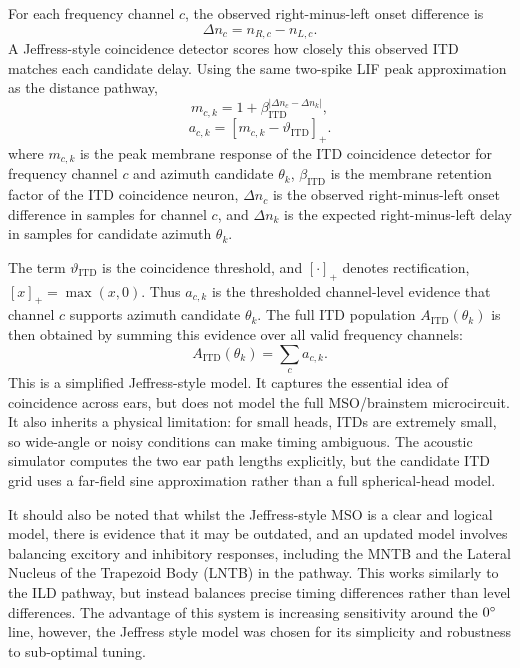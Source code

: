 For each frequency channel $c$, the observed right-minus-left onset difference is
\begin{equation}
    \Delta n_c = n_{R,c} - n_{L,c}.
\end{equation}
A Jeffress-style coincidence detector scores how closely this observed ITD matches each candidate delay. Using the same two-spike LIF peak approximation as the distance pathway,
\begin{equation}
    m_{c,k}
    =
    1 + \beta_{\mathrm{ITD}}^{|\Delta n_c-\Delta n_k|},
\end{equation}
\begin{equation}
    a_{c,k}
    =
    \left[
        m_{c,k}
        -
        \vartheta_{\mathrm{ITD}}
    \right]_+ .
\end{equation}
where $m_{c,k}$ is the peak membrane response of the ITD coincidence detector for frequency channel $c$ and azimuth candidate $\theta_k$, $\beta_{\mathrm{ITD}}$ is the membrane retention factor of the ITD coincidence neuron, $\Delta n_c$ is the observed right-minus-left onset difference in samples for channel $c$, and $\Delta n_k$ is the expected right-minus-left delay in samples for candidate azimuth $\theta_k$.

The term $\vartheta_{\mathrm{ITD}}$ is the coincidence threshold, and $[\cdot]_+$ denotes rectification, $[x]_+=\max(x,0)$. Thus $a_{c,k}$ is the thresholded channel-level evidence that channel $c$ supports azimuth candidate $\theta_k$. The full ITD population $A_{\mathrm{ITD}}(\theta_k)$ is then obtained by summing this evidence over all valid frequency channels:
\begin{equation}
    A_{\mathrm{ITD}}(\theta_k)
    =
    \sum_c a_{c,k}.
\end{equation}
This is a simplified Jeffress-style model. It captures the essential idea of coincidence across ears, but does not model the full MSO/brainstem microcircuit. It also inherits a physical limitation: for small heads, ITDs are extremely small, so wide-angle or noisy conditions can make timing ambiguous. The acoustic simulator computes the two ear path lengths explicitly, but the candidate ITD grid uses a far-field sine approximation rather than a full spherical-head model.

It should also be noted that whilst the Jeffress-style MSO is a clear and logical model, there is evidence that it may be outdated, and an updated model involves balancing excitory and inhibitory responses, including the MNTB and the Lateral Nucleus of the Trapezoid Body (LNTB) in the pathway. This works similarly to the ILD pathway, but instead balances precise timing differences rather than level differences. The advantage of this system is increasing sensitivity around the $0 \degree$ line, however, the Jeffress style model was chosen for its simplicity and robustness to sub-optimal tuning.


